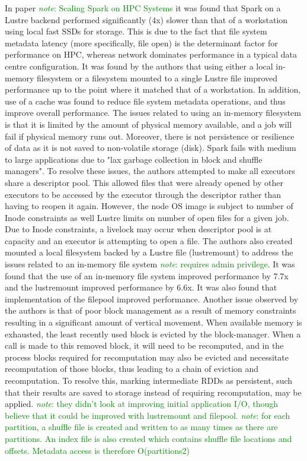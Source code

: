 \documentclass{report}
\newcommand{\note}[1]{\textcolor{green}{\textit{note}: #1}}
\begin{document}
	In paper \note{Scaling Spark on HPC Systems} it was found that Spark on a Lustre backend performed significantly (4x) slower than that of a workstation using local fast SSDs for storage. This is due to the fact that file system metadata latency (more specifically, file open) is the determinant factor for performance on HPC, whereas network dominates performance in a typical data centre configuration. It was found by the authors that using either a local in-memory filesystem or a filesystem mounted to a single Lustre file improved performance up to the point where it matched that of a workstation. In addition, use of a cache was found to reduce file system metadata operations, and thus improve overall performance. 
	The issues related to using an in-memory filesystem is that it is limited by the amount of physical memory available, and a job will fail if physical memory runs out. Moreover, there is not persistence or resilience of data as it is not saved to non-volatile storage (disk). Spark fails with medium to large applications due to "lax garbage collection in block and shuffle managers". To resolve these issues, the authors attempted to make all executors share a descriptor pool. This allowed files that were already opened by other executors to be accessed by the executor through the descriptor rather than having to reopen it again. However, the node OS image is subject to number of Inode constraints as well Lustre limits on number of open files for a given job. Due to Inode constraints, a livelock may occur when descriptor pool is at capacity and an executor is attempting to open a file. The authors also created mounted a local filesystem backed by a Lustre file (lustremount) to address the issues related to an in-memory file system \note{requires admin privilege}. It was found that the use of an in-memory file system improved performance by 7.7x and the lustremount improved performance by 6.6x. It was also found that implementation of the filepool improved performance.
	Another issue observed by the authors is that of poor block management as a result of memory constraints resulting in a significant amount of vertical movement. When available memory is exhausted, the least recently used block is evicted by the block-manager. When a call is made to this removed block, it will need to be recomputed, and in the process blocks required for recomputation may also be evicted and necessitate recomputation of those blocks, thus leading to a chain of eviction and recomputation. To resolve this, marking intermediate RDDs as persistent, such that their results are saved to storage instead of requiring recomputation, may be applied.
	\note{they didn't look at improving initial application I/O, though believe that it could be improved with lustremount and filepool. }
	\note{for each partition, a shuffle file is created and written to as many times as there are partitions. An index file is also created which contains shuffle file locations and offsets. Metadata access is therefore O(partitions2)}
	
\end{document}
